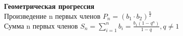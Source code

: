 \textbf{Геометрическая прогрессия} \\
Произведение n первых членов $P_n = (b_1 \cdot b_2)^{\frac{n}{2}}$ \\
Сумма n первых членов $\displaystyle S_n = \sum_{i=1}^{n}b_i = \frac{b_1(1-q^n)}{1-q}, q \ne 1$